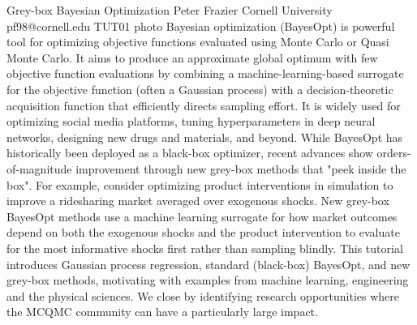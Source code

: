 \begin{talk}
 {Grey-box Bayesian Optimization}%
 {Peter Frazier}%
 {Cornell University}%
 {pf98@cornell.edu}%
 {}%
 {}%
 {}%
 {TUT01}%
 {photo}%
Bayesian optimization (BayesOpt) is powerful tool for optimizing objective functions evaluated using Monte Carlo or Quasi Monte Carlo. It aims to produce an approximate global optimum with few objective function evaluations by combining a machine-learning-based surrogate for the objective function (often a Gaussian process) with a decision-theoretic acquisition function that efficiently directs sampling effort.  It is widely used for optimizing social media platforms, tuning hyperparameters in deep neural networks, designing new drugs and materials, and beyond. While BayesOpt has historically been deployed as a black-box optimizer, recent advances show orders-of-magnitude improvement through new grey-box methods that "peek inside the box".  For example, consider optimizing product interventions in simulation to improve a ridesharing market averaged over exogenous shocks. New grey-box BayesOpt methods use a machine learning surrogate for how market outcomes depend on both the exogenous shocks and the product intervention to evaluate for the most informative shocks first rather than sampling blindly. This tutorial introduces Gaussian process regression, standard (black-box) BayesOpt, and new grey-box methods, motivating with examples from machine learning, engineering and the physical sciences. We close by identifying research opportunities where the MCQMC community can have a particularly large impact.

\end{talk}

\clearpage